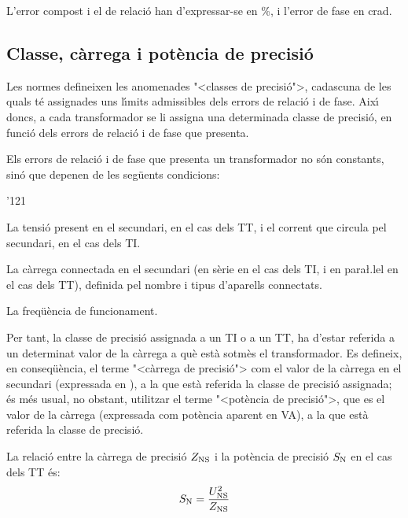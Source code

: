 L'error compost i el de relaci\'{o} han d'expressar-se en \%, i l'error
de fase en crad.

\subsection{Classe, c\`{a}rrega i pot\`{e}ncia de precisi\'{o}}

Les normes defineixen les anomenades {"<}classes de precisi\'{o}{">},
cadascuna de les quals t\'{e} assignades uns l\'{\i}mits admissibles dels
errors de relaci\'{o} i de fase. Aix\'{\i} doncs, a cada transformador se li
assigna una determinada classe de precisi\'{o}, en funci\'{o} dels errors de
relaci\'{o} i de fase que presenta.

Els errors de relaci\'{o} i de fase que presenta un transformador no s\'{o}n
constants, sin\'{o} que depenen de les seg\"{u}ents condicions:
\begin{dinglist}{'121}
   \item La tensi\'{o} present en el secundari, en el cas dels TT, i el corrent que
   circula    pel secundari, en el cas dels TI.
   \item La c\`{a}rrega connectada en el secundari (en s\`{e}rie en el cas dels TI,
   i en para{\l.l}el en el cas dels TT), definida pel nombre i tipus d'aparells connectats.
   \item La freq\"{u}\`{e}ncia de funcionament.
\end{dinglist}

Per tant, la classe de precisi\'{o} assignada a un TI o a un TT, ha
d'estar  referida a un determinat valor de la c\`{a}rrega a qu\`{e} est\`{a}
sotm\`{e}s el transformador. Es defineix, en conseq\"{u}\`{e}ncia, el terme
{"<}c\`{a}rrega de precisi\'{o}{">} com el valor de la c\`{a}rrega en el secundari
(expressada en \ohm), a la que est\`{a} referida la classe de precisi\'{o}
assignada; \'{e}s m\'{e}s usual, no obstant,  utilitzar el terme {"<}pot\`{e}ncia
de precisi\'{o}{">}, que es el valor de la c\`{a}rrega (expressada com pot\`{e}ncia
aparent en VA),
 a la que est\`{a} referida la classe de precisi\'{o}.

La relaci\'{o} entre la c\`{a}rrega de precisi\'{o} $Z_\mathrm{NS}$ i la pot\`{e}ncia de
precisi\'{o} $S_\mathrm{N}$ en el cas dels TT \'{e}s:
\begin{equation}
    S_\mathrm{N} = \frac{U_\mathrm{NS}^2}{Z_\mathrm{NS}}
\end{equation}

